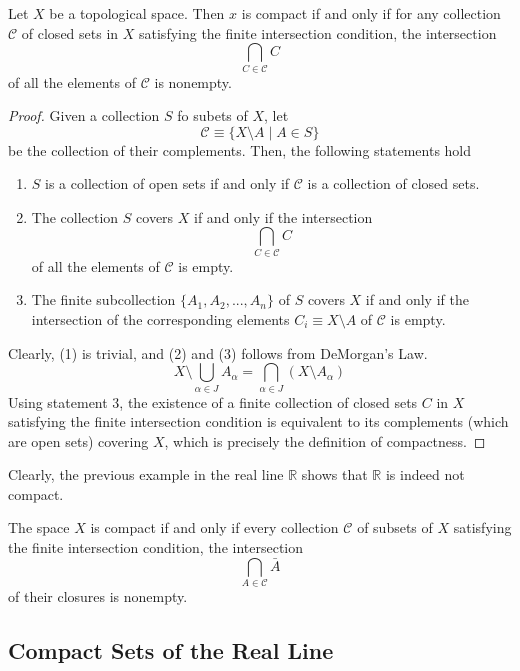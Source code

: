\documentclass{article}
\begin{document}
    \begin{theorem}
    Let $X$ be a topological space. Then $x$ is compact if and only if for any collection $\mathcal{C}$ of closed sets in $X$ satisfying the finite intersection condition, the intersection 
    \[\bigcap_{C \in \mathcal{C}} C\]
    of all the elements of $\mathcal{C}$ is nonempty. 
    \end{theorem}
    \begin{proof}
    Given a collection $S$ fo subets of $X$, let 
    \[\mathcal{C} \equiv \{X \setminus A \; | \; A \in S\}\]
    be the collection of their complements. Then, the following statements hold 
    \begin{enumerate}
        \item $S$ is a collection of open sets if and only if $\mathcal{C}$ is a collection of closed sets. 
        \item The collection $S$ covers $X$ if and only if the intersection 
        \[\bigcap_{C \in \mathcal{C}} C\]
        of all the elements of $\mathcal{C}$ is empty. 
        \item The finite subcollection $\{A_1, A_2, ..., A_n\}$ of $S$ covers $X$ if and only if the intersection of the corresponding elements $C_i \equiv X \setminus A$ of $\mathcal{C}$ is empty. 
    \end{enumerate}
    Clearly, (1) is trivial, and (2) and (3) follows from DeMorgan's Law. 
    \[X \setminus \bigcup_{\alpha \in J} A_\alpha = \bigcap_{\alpha \in J} (X \setminus A_\alpha)\]
    Using statement 3, the existence of a finite collection of closed sets $C$ in $X$ satisfying the finite intersection condition is equivalent to its complements (which are open sets) covering $X$, which is precisely the definition of compactness. 
    \end{proof}

    Clearly, the previous example in the real line $\mathbb{R}$ shows that $\mathbb{R}$ is indeed not compact. 

    \begin{corollary}
    The space $X$ is compact if and only if every collection $\mathscr{C}$ of subsets of $X$ satisfying the finite intersection condition, the intersection 
    \[\bigcap_{A \in \mathscr{C}} \bar{A}\]
    of their closures is nonempty. 
    \end{corollary}

  \subsection{Compact Sets of the Real Line}
\end{document}
